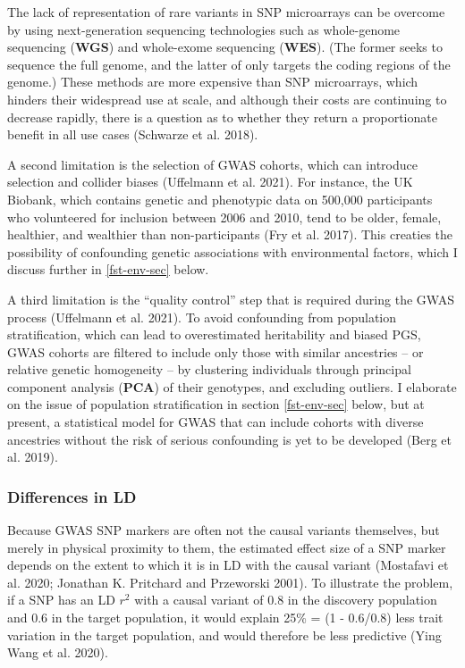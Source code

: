 \documentclass[
]{book}
\begin{document}
The lack of representation of rare variants in SNP microarrays can be overcome by using next-generation sequencing technologies such as whole-genome sequencing (\textbf{WGS}) and whole-exome sequencing (\textbf{WES}). (The former seeks to sequence the full genome, and the latter of only targets the coding regions of the genome.) These methods are more expensive than SNP microarrays, which hinders their widespread use at scale, and although their costs are continuing to decrease rapidly, there is a question as to whether they return a proportionate benefit in all use cases (Schwarze et al. 2018).

A second limitation is the selection of GWAS cohorts, which can introduce selection and collider biases (Uffelmann et al. 2021). For instance, the UK Biobank, which contains genetic and phenotypic data on 500,000 participants who volunteered for inclusion between 2006 and 2010, tend to be older, female, healthier, and wealthier than non-participants (Fry et al. 2017). This creaties the possibility of confounding genetic associations with environmental factors, which I discuss further in \ref{fst-env-sec} below.

A third limitation is the ``quality control'' step that is required during the GWAS process (Uffelmann et al. 2021). To avoid confounding from population stratification, which can lead to overestimated heritability and biased PGS, GWAS cohorts are filtered to include only those with similar ancestries -- or relative genetic homogeneity -- by clustering individuals through principal component analysis (\textbf{PCA}) of their genotypes, and excluding outliers. I elaborate on the issue of population stratification in section \ref{fst-env-sec} below, but at present, a statistical model for GWAS that can include cohorts with diverse ancestries without the risk of serious confounding is yet to be developed (Berg et al. 2019).

\hypertarget{differences-in-ld}{%
\subsubsection{Differences in LD}\label{differences-in-ld}}

Because GWAS SNP markers are often not the causal variants themselves, but merely in physical proximity to them, the estimated effect size of a SNP marker depends on the extent to which it is in LD with the causal variant (Mostafavi et al. 2020; Jonathan K. Pritchard and Przeworski 2001). To illustrate the problem, if a SNP has an LD \(r^2\) with a causal variant of 0.8 in the discovery population and 0.6 in the target population, it would explain 25\% = (1 - 0.6/0.8) less trait variation in the target population, and would therefore be less predictive (Ying Wang et al. 2020).
\end{document}
